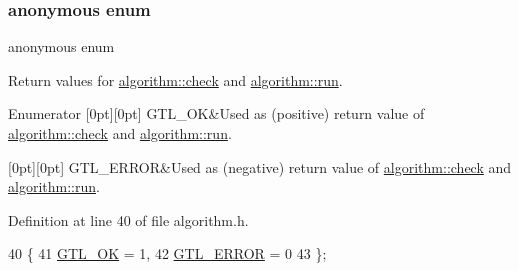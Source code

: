 \subsubsection{\texorpdfstring{anonymous enum}{anonymous enum}}
{\footnotesize\ttfamily anonymous enum\hspace{0.3cm}{\ttfamily [inherited]}}



Return values for \mbox{\hyperlink{classalgorithm_a76361fb03ad1cf643affc51821e43bed}{algorithm\+::check}} and \mbox{\hyperlink{classalgorithm_a734b189509a8d6b56b65f8ff772d43ca}{algorithm\+::run}}. 

\begin{DoxyEnumFields}{Enumerator}
[0pt][0pt]{}\mbox{\label{classalgorithm_af1a0078e153aa99c24f9bdf0d97f6710a5114c20e4a96a76b5de9f28bf15e282b}} 
G\+T\+L\+\_\+\+OK&Used as (positive) return value of \mbox{\hyperlink{classalgorithm_a76361fb03ad1cf643affc51821e43bed}{algorithm\+::check}} and \mbox{\hyperlink{classalgorithm_a734b189509a8d6b56b65f8ff772d43ca}{algorithm\+::run}}. \\
\hline

[0pt][0pt]{}\mbox{\label{classalgorithm_af1a0078e153aa99c24f9bdf0d97f6710a6fcf574690bbd6cf710837a169510dd7}} 
G\+T\+L\+\_\+\+E\+R\+R\+OR&Used as (negative) return value of \mbox{\hyperlink{classalgorithm_a76361fb03ad1cf643affc51821e43bed}{algorithm\+::check}} and \mbox{\hyperlink{classalgorithm_a734b189509a8d6b56b65f8ff772d43ca}{algorithm\+::run}}. \\
\hline

\end{DoxyEnumFields}


Definition at line 40 of file algorithm.\+h.


\begin{DoxyCode}
40          \{
41     \mbox{\hyperlink{classalgorithm_af1a0078e153aa99c24f9bdf0d97f6710a5114c20e4a96a76b5de9f28bf15e282b}{GTL\_OK}} = 1,
42     \mbox{\hyperlink{classalgorithm_af1a0078e153aa99c24f9bdf0d97f6710a6fcf574690bbd6cf710837a169510dd7}{GTL\_ERROR}} = 0
43     \};
\end{DoxyCode}


